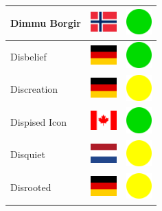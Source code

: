 \documentclass[12pt, a4paper, twoside]{report}
\begin{document}
\begin{center}
\begin{longtable}{|p{5cm}|p{2cm}|p{2cm}|}
Dimmu Borgir & \includegraphics[width=1cm]{4x3/no} & \includegraphics[width=1cm]{likes/y} \\ \hline
Disbelief & \includegraphics[width=1cm]{4x3/de} & \includegraphics[width=1cm]{likes/y} \\ \hline
Discreation & \includegraphics[width=1cm]{4x3/de} & \includegraphics[width=1cm]{likes/m} \\ \hline
Dispised Icon & \includegraphics[width=1cm]{4x3/ca} & \includegraphics[width=1cm]{likes/y} \\ \hline
Disquiet & \includegraphics[width=1cm]{4x3/nl} & \includegraphics[width=1cm]{likes/m} \\ \hline
Disrooted & \includegraphics[width=1cm]{4x3/de} & \includegraphics[width=1cm]{likes/m} \\ \hline

\end{longtable}
\end{center}
\end{document}
